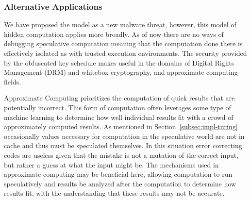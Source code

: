 \subsubsection{Alternative Applications}
We have proposed the \speculake model as a new malware threat, however, this
model of hidden computation applies more broadly. As of now there are no ways of
debugging speculative computation meaning that the computation done there is
effectively isolated as with trusted execution environments. The security
provided by the obfuscated key schedule makes \speculake useful in the domains
of Digital Rights Management (DRM) and whitebox cryptography, and approximate
computing fields. 

Approximate Computing prioritizes the computation of quick results that are
potentially incorrect. This form of computation often leverages some type of
machine learning to determine how well individual results fit with a crowd of
approximately computed results. As mentioned in Section~\ref{subsec:impl-turing}
occasionally values necessary for computation in the speculative world are not
in cache and thus must be speculated themselves. In this situation error
correcting codes are useless given that the mistake is not a mutation of the
correct input, but rather a guess at what the input might be. The mechanisms
used in approximate computing may be beneficial here, allowing computation to
run speculatively and results be analyzed after the computation to determine how
results fit, with the understanding that these results may not be accurate.



